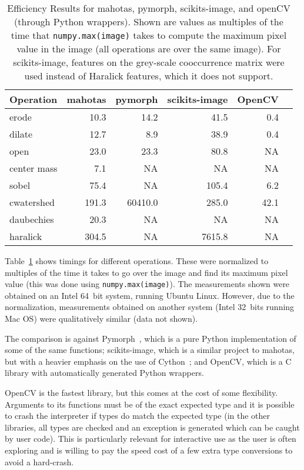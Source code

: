 \documentclass{scrartcl}
\newcommand*{\cpp}{{C\nolinebreak[4]\hspace{-.05em}\raisebox{.4ex}{\tiny\textbf{++}}}}
\let\code\texttt
\begin{document}
\begin{table}
\centering
\begin{tabular}{lrrrrr}
\toprule
Operation & mahotas & pymorph & scikits-image & OpenCV\\
\midrule
erode       &     10.3 &     14.2 &     41.5 &      0.4 & \\
dilate      &     12.7 &      8.9 &     38.9 &      0.4 & \\
open        &     23.0 &     23.3 &     80.8 &       NA & \\
center mass &      7.1 &       NA &       NA &       NA & \\
sobel       &     75.4 &       NA &    105.4 &      6.2 & \\
cwatershed  &    191.3 &  60410.0 &    285.0 &     42.1 & \\
daubechies  &     20.3 &       NA &       NA &       NA & \\
haralick    &    304.5 &       NA &   7615.8 &       NA & \\
\bottomrule
\end{tabular}
\caption{Efficiency Results for mahotas, pymorph, scikits-image, and openCV
(through Python wrappers). Shown are values as multiples of the time that
\code{numpy.max(image)} takes to compute the maximum pixel value in the image
(all operations are over the same image). For scikits-image, features on the
grey-scale cooccurrence matrix were used instead of Haralick features, which it
does not support.}
\label{tab:efficiency}
\end{table}

Table~\ref{tab:efficiency} shows timings for different operations. These were
normalized to multiples of the time it takes to go over the image and find its
maximum pixel value (this was done using \code{numpy.max(image)}). The
measurements shown were obtained on an Intel 64~bit system, running Ubuntu
Linux. However, due to the normalization, measurements obtained on another
system (Intel 32~bits running Mac OS) were qualitatively similar (data not
shown).

The comparison is against Pymorph~\citep{DougLotu:03}, which is a pure Python
implementation of some of the same functions; scikits-image, which is a similar
project to mahotas, but with a heavier emphasis on the use of
Cython~\citep{Cython}; and OpenCV, which is a \cpp{} library with automatically
generated Python wrappers.

OpenCV is the fastest library, but this comes at the cost of some flexibility.
Arguments to its functions must be of the exact expected type and it is
possible to crash the interpreter if types do match the expected type (in the
other libraries, all types are checked and an exception is generated which can
be caught by user code). This is particularly relevant for interactive use as
the user is often exploring and is willing to pay the speed cost of a few extra
type conversions to avoid a hard-crash.
\end{document}
